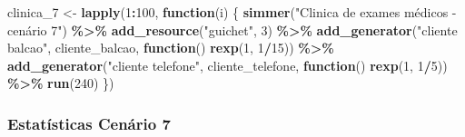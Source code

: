 \documentclass[
]{article}
\newenvironment{Shaded}{\begin{snugshade}}{\end{snugshade}}
\newcommand{\AttributeTok}[1]{\textcolor[rgb]{0.13,0.29,0.53}{#1}}
\newcommand{\CommentTok}[1]{\textcolor[rgb]{0.56,0.35,0.01}{\textit{#1}}}
\newcommand{\ControlFlowTok}[1]{\textcolor[rgb]{0.13,0.29,0.53}{\textbf{#1}}}
\newcommand{\DecValTok}[1]{\textcolor[rgb]{0.00,0.00,0.81}{#1}}
\newcommand{\FunctionTok}[1]{\textcolor[rgb]{0.13,0.29,0.53}{\textbf{#1}}}
\newcommand{\NormalTok}[1]{#1}
\newcommand{\OtherTok}[1]{\textcolor[rgb]{0.56,0.35,0.01}{#1}}
\newcommand{\SpecialCharTok}[1]{\textcolor[rgb]{0.81,0.36,0.00}{\textbf{#1}}}
\newcommand{\StringTok}[1]{\textcolor[rgb]{0.31,0.60,0.02}{#1}}
\begin{document}
\begin{Shaded}
\begin{Highlighting}[]
\NormalTok{clinica\_7 }\OtherTok{\textless{}{-}} \FunctionTok{lapply}\NormalTok{(}\DecValTok{1}\SpecialCharTok{:}\DecValTok{100}\NormalTok{, }\ControlFlowTok{function}\NormalTok{(i) \{}
  \FunctionTok{simmer}\NormalTok{(}\StringTok{"Clinica de exames médicos {-} cenário 7"}\NormalTok{) }\SpecialCharTok{\%\textgreater{}\%}
  \FunctionTok{add\_resource}\NormalTok{(}\StringTok{"guichet"}\NormalTok{, }\DecValTok{3}\NormalTok{) }\SpecialCharTok{\%\textgreater{}\%}
  \FunctionTok{add\_generator}\NormalTok{(}\StringTok{"cliente balcao"}\NormalTok{, cliente\_balcao, }\ControlFlowTok{function}\NormalTok{() }\FunctionTok{rexp}\NormalTok{(}\DecValTok{1}\NormalTok{, }\DecValTok{1}\SpecialCharTok{/}\DecValTok{15}\NormalTok{)) }\SpecialCharTok{\%\textgreater{}\%}
  \FunctionTok{add\_generator}\NormalTok{(}\StringTok{"cliente telefone"}\NormalTok{, cliente\_telefone, }\ControlFlowTok{function}\NormalTok{() }\FunctionTok{rexp}\NormalTok{(}\DecValTok{1}\NormalTok{, }\DecValTok{1}\SpecialCharTok{/}\DecValTok{5}\NormalTok{)) }\SpecialCharTok{\%\textgreater{}\%}
  \FunctionTok{run}\NormalTok{(}\DecValTok{240}\NormalTok{)}
\NormalTok{\})}
\end{Highlighting}
\end{Shaded}

\subsubsection{Estatísticas Cenário
7}\label{estatuxedsticas-cenuxe1rio-7}

\begin{Shaded}
\end{Shaded}
\end{document}
